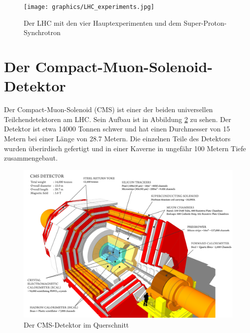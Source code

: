 \begin{figure}[tbp]
 \begin{center}
   \texttt{[image: graphics/LHC\_experiments.jpg]}
   \parbox[b]{12cm}{
     \caption[Large-Hadron-Collider]
             {\label{fig:LHC}\!Der LHC mit den vier Hauptexperimenten und dem Super-Proton-Synchrotron \cite{Team:40525}}
   }
 \end{center}
\end{figure}

\section{Der Compact-Muon-Solenoid-Detektor}
\label{ch:Experiment:sec:CMS}

Der Compact-Muon-Solenoid (CMS) ist einer der beiden universellen Teilchendetektoren am LHC. Sein Aufbau ist in Abbildung \ref{fig:cms_sectional} zu sehen. Der Detektor ist etwa \num{14000} Tonnen schwer und hat einen Durchmesser von \num{15} Metern bei einer L\"ange von \num{28,7} Metern. Die einzelnen Teile des Detektors wurden \"uberirdisch gefertigt und in einer Kaverne in ungef\"ahr \num{100} Metern Tiefe zusammengebaut.
\begin{figure}[tbp]
 \begin{center}
   \includegraphics[width=\textwidth]{graphics/cms_sectional.png}
   \parbox[b]{12cm}{
     \caption[CMS-Detektor]
             {\label{fig:cms_sectional}\!Der CMS-Detektor im Querschnitt \cite{cms_sectional}}
   }
 \end{center}
\end{figure}

